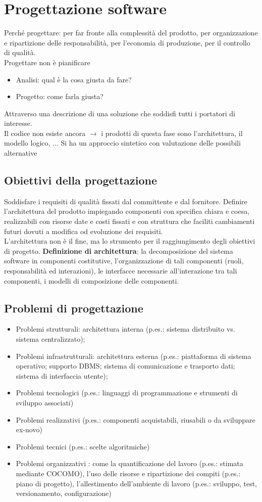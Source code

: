 \section{Progettazione software}
Perché progettare: per far fronte alla complessità del prodotto, per organizzazione e ripartizione delle responsabilità, per l'economia di produzione, per il controllo di qualità.\\
Progettare non è pianificare
\begin{itemize}
\item Analisi: qual è la cosa giusta da fare?
\item Progetto: come farla giusta?
\end{itemize}
Attraverso una descrizione di una soluzione che soddisfi tutti i portatori di interesse.\\
Il codice non esiste ancora $\rightarrow$ i prodotti di questa fase sono l'architettura, il modello logico, ... Si ha un approccio sintetico con valutazione delle possibili alternative
\subsection{Obiettivi della progettazione}
Soddisfare i requisiti di qualità fissati dal committente e dal fornitore.
Definire l'architettura del prodotto impiegando componenti con specifica chiara e coesa, realizzabili con risorse date e costi fissati e con struttura che faciliti cambiamenti futuri dovuti a modifica od evoluzione dei requisiti.\\
L'architettura non è il fine, ma lo strumento per il raggiungimento degli obiettivi di progetto.
\textbf{Definizione di architettura}: la decomposizione del sistema software in componenti costitutive, l'organizzazione di tali componenti (ruoli, responsabilità ed interazioni), le interfacce necessarie all'interazione tra tali componenti, i modelli di composizione delle componenti.
\subsection{Problemi di progettazione}
\begin{itemize}
\item Problemi strutturali: architettura interna (p.es.: sistema distribuito vs. sistema centralizzato);
\item Problemi infrastrutturali: architettura esterna (p.es.: piattaforma di sistema operativo; supporto DBMS; sistema di comunicazione e trasporto dati; sistema di interfaccia utente);
\item Problemi tecnologici (p.es.: linguaggi di programmazione e strumenti di sviluppo associati)
\item Problemi realizzativi (p.es.: componenti acquistabili, riusabili o da sviluppare ex-novo)
\item Problemi tecnici (p.es.: scelte algoritmiche)
\item Problemi organizzativi : come la quantificazione del lavoro (p.es.: stimata mediante COCOMO), l'uso delle risorse e ripartizione dei compiti (p.es.: piano di progetto), l'allestimento dell'ambiente di lavoro (p.es.: sviluppo, test, versionamento, configurazione)
\end{itemize}

